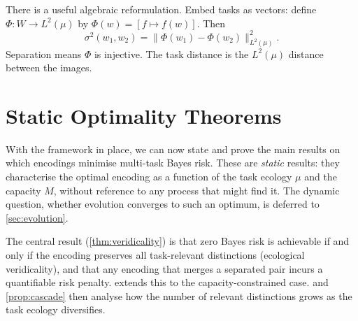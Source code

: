 \documentclass[12pt]{article}
\newcommand{\sigmasq}{\sigma^2}
\begin{document}
There is a useful algebraic reformulation. Embed tasks as vectors: define $\Phi\colon W \to L^2(\mu)$ by $\Phi(w) = [f \mapsto f(w)]$. Then
\begin{equation}\label{eq:embedding}
\sigmasq(w_1, w_2) = \|\Phi(w_1) - \Phi(w_2)\|^2_{L^2(\mu)}.
\end{equation}
Separation means $\Phi$ is injective. The task distance is the $L^2(\mu)$ distance between the images.

\section{Static Optimality Theorems}\label{sec:static}

With the framework in place, we can now state and prove the main results on which encodings minimise multi-task Bayes risk. These are \emph{static} results: they characterise the optimal encoding as a function of the task ecology $\mu$ and the capacity $M$, without reference to any process that might find it. The dynamic question, whether evolution converges to such an optimum, is deferred to \cref{sec:evolution}.

The central result (\cref{thm:veridicality}) is that zero Bayes risk is achievable if and only if the encoding preserves all task-relevant distinctions (ecological veridicality), and that any encoding that merges a separated pair incurs a quantifiable risk penalty.  extends this to the capacity-constrained case.  and \cref{prop:cascade} then analyse how the number of relevant distinctions grows as the task ecology diversifies.
\end{document}
